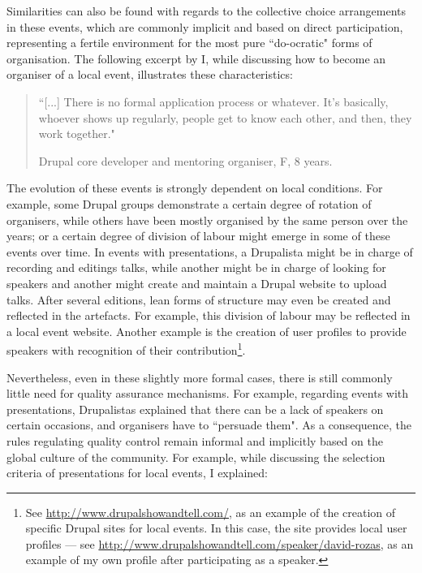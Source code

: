 Similarities can also be found with regards to the collective choice arrangements in these events, which are commonly implicit and based on direct participation, representing a fertile environment for the most pure ``do-ocratic" forms of organisation. The following excerpt by I, while discussing how to become an organiser of a local event, illustrates these characteristics:

\begin{quotation}
``[...] There is no formal application process or whatever. It's basically, whoever shows up regularly, people get to know each other, and then, they work together."

\begin{flushright}\footnotesize{Drupal core developer and mentoring organiser, F, 8 years.}\end{flushright}
\end{quotation}

The evolution of these events is strongly dependent on local conditions. For example, some Drupal groups demonstrate a certain degree of rotation of organisers, while others have been mostly organised by the same person over the years; or a certain degree of division of labour might emerge in some of these events over time. In events with presentations, a Drupalista might be in charge of recording and editings talks, while another might be in charge of looking for speakers and another might create and maintain a Drupal website to upload talks. After several editions, lean forms of structure may even be created and reflected in the artefacts. For example, this division of labour may be reflected in a local event website. Another example is the creation of user profiles to provide speakers with recognition of their contribution\footnote{See \url{http://www.drupalshowandtell.com/}, as an example of the creation of specific Drupal sites for local events. In this case, the site provides local user profiles --- see \url{http://www.drupalshowandtell.com/speaker/david-rozas}, as an example of my own profile after participating as a speaker.}.

Nevertheless, even in these slightly more formal cases, there is still commonly little need for quality assurance mechanisms. For example, regarding events with presentations, Drupalistas explained that there can be a lack of speakers on certain occasions, and organisers have to ``persuade them". As a consequence, the rules regulating quality control remain informal and implicitly based on the global culture of the community. For example, while discussing the selection criteria of presentations for local events, I explained:

